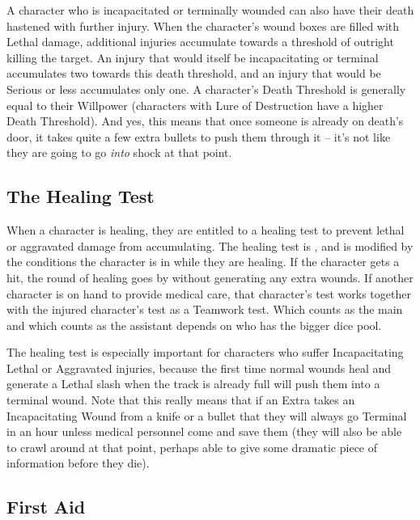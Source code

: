 A character who is incapacitated or terminally wounded can also have their death hastened with further injury. When the character's wound boxes are filled with Lethal damage, additional injuries accumulate towards a threshold of outright killing the target. An injury that would itself be incapacitating or terminal accumulates two towards this death threshold, and an injury that would be Serious or less accumulates only one. A character's Death Threshold is generally equal to their Willpower (characters with Lure of Destruction have a higher Death Threshold). And yes, this means that once someone is already on death's door, it takes quite a few extra bullets to push them through it -- it's not like they are going to go \textit{into} shock at that point.

\subsection{The Healing Test} 

\hspace{\parindent} When a character is healing, they are entitled to a healing test to prevent lethal or aggravated damage from accumulating. The healing test is , and is modified by the conditions the character is in while they are healing. If the character gets a hit, the round of healing goes by without generating any extra wounds. If another character is on hand to provide medical care, that character's  test works together with the injured character's  test as a Teamwork test. Which counts as the main and which counts as the assistant depends on who has the bigger dice pool.

The healing test is especially important for characters who suffer Incapacitating Lethal or Aggravated injuries, because the first time normal wounds heal and generate a Lethal slash when the track is already full will push them into a terminal wound. Note that this really means that if an Extra takes an Incapacitating Wound from a knife or a bullet that they will always go Terminal in an hour unless medical personnel come and save them (they will also be able to crawl around at that point, perhaps able to give some dramatic piece of information before they die).

\subsection{First Aid}

